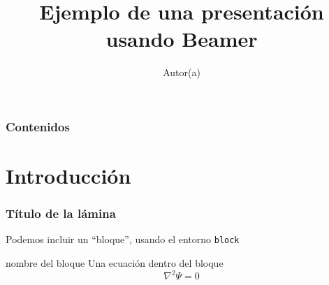 \documentclass[hyperref={colorlinks},aspectratio=169]{beamer}
\begin{document}
\title[\LaTeX]{Ejemplo de una presentación usando Beamer}
\author[iniciales de autor(a)]{Autor(a)} 
\frame{\titlepage}

\begin{frame}
\frametitle{Contenidos}
\tableofcontents
\end{frame}


\section{Introducción}
\begin{frame}[fragile]\frametitle{Título de la lámina}
Podemos incluir un ``bloque'', usando el entorno \texttt{block}
\begin{block}{nombre del bloque}
Una ecuación dentro del bloque
\begin{equation}
\nabla^2\Psi=0
\end{equation}
\end{block}
\end{frame}
\end{document}
